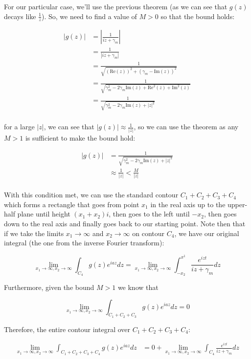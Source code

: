 For our particular case, we'll use the previous theorem (as we can see that $g(z)$ decays like $\frac{1}{z}$). So, we need to find a value of $M>0$ so that the bound holds:

\begin{align*}
\left|g(z)\right| &= \left|\frac{1}{iz+\gamma_m}\right|\\
&= \frac{1}{\left|iz+\gamma_m\right|}\\
&= \frac{1}{\sqrt{(\text{Re}(z))^2 + (\gamma_m - \text{Im}(z))^2}}\\
&= \frac{1}{\sqrt{\gamma_m^2 - 2\gamma_m\text{Im}(z) + \text{Re}^2(z) +\text{Im}^2(z)}}\\
&= \frac{1}{\sqrt{\gamma_m^2 - 2\gamma_m\text{Im}(z) + \left|z\right|^2}}\\
\end{align*}

for a large $\left|z\right|$, we can see that $\left|g(z)\right| \approx \frac{1}{\left|z\right|}$, so we can use the theorem as any $M>1$ is sufficient to make the bound hold:

\begin{align*}
\left|g(z)\right| &= \frac{1}{\sqrt{\gamma_m^2 - 2\gamma_m\text{Im}(z) + \left|z\right|^2}}\\
&\approx \frac{1}{\left|z\right|} < \frac{M}{\left|z\right|}\\
\end{align*}

With this condition met, we can use the standard contour $C_1+C_2+C_3 + C_4$ which forms a rectangle that goes from point $x_1$ in the real axis up to the upper-half plane until height $(x_1+x_2)i$, then goes to the left until $-x_2$, then goes down to the real axis and finally goes back to our starting point. Note then that if we take the limits $x_1\to\infty$ and $x_2\to\infty$ on contour $C_4$, we have our original integral (the one from the inverse Fourier transform):

$$
\lim_{x_1\to\infty, x_2\to\infty}\int_{C_4}g(z)e^{iaz}dz = \lim_{x_1\to\infty, x_2\to\infty}\int_{-x_2}^{x^1}\frac{e^{iz t}}{iz+\gamma_m}dz
$$

Furthermore, given the bound $M > 1$ we know that

$$
\lim_{x_1\to\infty, x_2\to\infty}\int_{C_1+C_2+C_3}g(z)e^{iaz}dz = 0
$$

Therefore, the entire contour integral over $C_1 + C_2 + C_3 + C_4$:

\begin{align*}
\lim_{x_1\to\infty, x_2\to\infty}\int_{C_1+C_2+C_3+C_4}g(z)e^{iaz}dz &= 0 + \lim_{x_1\to\infty, x_2\to\infty}\int_{C_4}\frac{e^{izt}}{iz+\gamma_m}dz
\end{align*}

